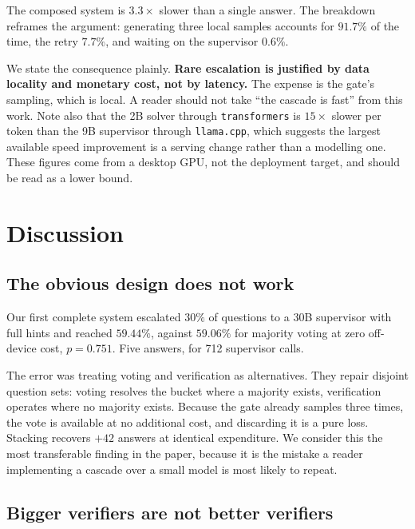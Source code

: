 \documentclass[conference]{IEEEtran}
\begin{document}
The composed system is $3.3\times$ slower than a single answer. The breakdown reframes the
argument: generating three local samples accounts for $91.7\%$ of the time, the retry
$7.7\%$, and waiting on the supervisor $0.6\%$.

We state the consequence plainly. \textbf{Rare escalation is justified by data locality and
monetary cost, not by latency.} The expense is the gate's sampling, which is local. A
reader should not take ``the cascade is fast'' from this work. Note also that the 2B solver
through \texttt{transformers} is $15\times$ slower per token than the 9B supervisor through
\texttt{llama.cpp}, which suggests the largest available speed improvement is a serving
change rather than a modelling one. These figures come from a desktop GPU, not the
deployment target, and should be read as a lower bound.

\section{Discussion}

\subsection{The obvious design does not work}

Our first complete system escalated $30\%$ of questions to a 30B supervisor with full hints
and reached $59.44\%$, against $59.06\%$ for majority voting at zero off-device cost,
$p=0.751$. Five answers, for 712 supervisor calls.

The error was treating voting and verification as alternatives. They repair disjoint
question sets: voting resolves the bucket where a majority exists, verification operates
where no majority exists. Because the gate already samples three times, the vote is
available at no additional cost, and discarding it is a pure loss. Stacking recovers $+42$
answers at identical expenditure. We consider this the most transferable finding in the
paper, because it is the mistake a reader implementing a cascade over a small model is most
likely to repeat.

\subsection{Bigger verifiers are not better verifiers}
\end{document}
